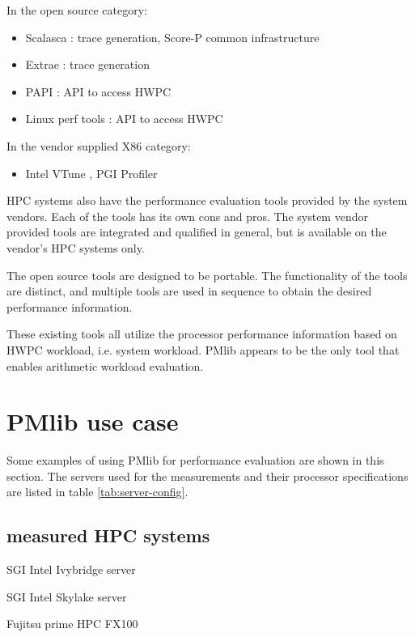 \documentclass[conference]{IEEEtran}
\begin{document}
In the open source category:
\begin{itemize}
	\item Scalasca \cite{Scalasca:2017} : trace generation, Score-P common
	infrastructure
	\item Extrae \cite{Extrae:webpage} :  trace generation
	\item PAPI \cite{PAPI:5.6} : API to access HWPC
	\item Linux perf tools : API to access HWPC
\end{itemize}

In the vendor supplied X86 category:
\begin{itemize}
		\item Intel VTune \cite{Intel:VTune}, PGI Profiler \cite{PGI:Profiler}
\end{itemize}

HPC systems also have the performance evaluation tools provided by the
system vendors.
Each of the tools has its own cons and pros.
The system vendor provided tools are integrated and qualified in general,
but is available on the vendor's HPC systems only.

The open source tools are designed to be portable. The functionality of the
tools are distinct, and multiple tools are used in sequence to obtain
the desired performance information.

These existing tools all utilize the processor performance information
based on HWPC workload, i.e. system workload.
PMlib appears to be the only tool that enables arithmetic workload
evaluation.



\section{PMlib use case}


Some examples of using PMlib for performance evaluation are shown in this
section.
The servers used for the measurements and their processor specifications
are listed in table \ref{tab:server-config}.

\subsection{measured HPC systems}

\begin{itemize}
{
\item SGI Intel Ivybridge server
\item SGI Intel Skylake server
\item Fujitsu prime HPC FX100
}
\end{itemize}
\end{document}
